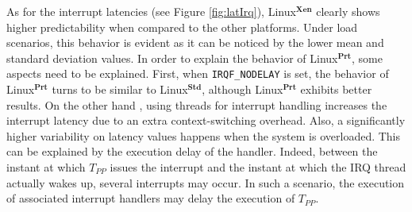 \documentclass{acm_proc_article-sp}
\newcommand{\cod}[1]{\hspace{0.1cm}\texttt{#1}}
\begin{document}
As for the interrupt latencies (see Figure \ref{fig:latIrq}), Linux$^{\mathbf{Xen}}$
clearly shows higher predictability when compared to the other platforms. Under load
scenarios, this behavior is evident as it can be noticed by the lower mean and
standard deviation values. In order to explain the behavior of
Linux$^{\mathbf{Prt}}$, some aspects need to be explained.  First, when
\cod{IRQF\_NODELAY} is set, the behavior of Linux$^{\mathbf{Prt}}$ turns to be
similar to Linux$^{\mathbf{Std}}$, although Linux$^{\mathbf{Prt}}$ exhibits better
results. On the other hand , using threads for interrupt handling increases the
interrupt latency due to an extra context-switching overhead.  Also, a significantly
higher variability on latency values happens when the system is overloaded. This can
be explained by the execution delay of the handler.  Indeed, between the instant at
which $T_{PP}$ issues the interrupt and the instant at which the IRQ thread actually
wakes up, several interrupts may occur.  In such a scenario, the execution of
associated interrupt handlers may delay the execution of $T_{PP}$.
\end{document}
